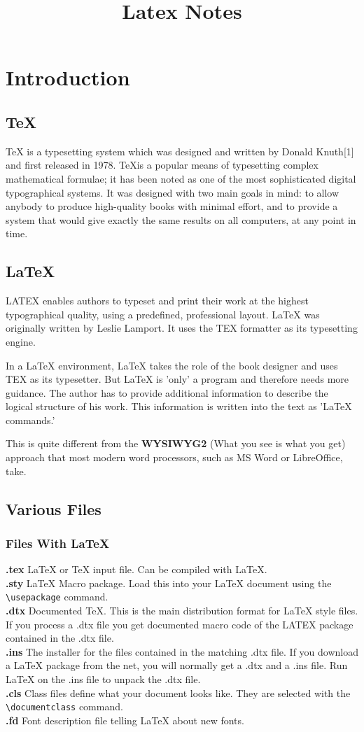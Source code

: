\documentclass[]{article}
\title{Latex Notes}
\begin{document}
\tableofcontents
\section{Introduction}
\subsection{\TeX}
\TeX\; is a typesetting system which was designed and written by Donald Knuth[1] and first released in 1978. \TeX \;is a popular means of typesetting complex mathematical formulae; it has been noted as one of the most sophisticated digital typographical systems. It was designed with two main goals in mind: to allow anybody to produce high-quality books with minimal effort, and to provide a system that would give exactly the same results on all computers, at any point in time.

\subsection{\LaTeX}
LATEX enables authors to typeset and print their work at the highest typographical quality, using a predefined, professional layout. \LaTeX\; was originally written by Leslie Lamport. It uses the TEX formatter as its typesetting engine.

In a \LaTeX\; environment, \LaTeX\; takes the role of the book designer and
uses TEX as its typesetter. But \LaTeX\; is 'only' a program and therefore
needs more guidance. The author has to provide additional information to
describe the logical structure of his work. This information is written into the text as '\LaTeX\; commands.'

This is quite different from the \textbf{WYSIWYG2} (What you see is what you get) approach that most modern word processors, such as MS Word or LibreOffice, take.

\subsection{Various Files}
\subsubsection{Files With \LaTeX}
\textbf{.tex} \LaTeX\; or \TeX\; input file. Can be compiled with \LaTeX\;.
\\ \textbf{.sty} \LaTeX\; Macro package. Load this into your \LaTeX\; document using the
\verb|\usepackage| command.
\\ \textbf{.dtx} Documented \TeX\;. This is the main distribution format for \LaTeX\; style
files. If you process a .dtx file you get documented macro code of the
LATEX package contained in the .dtx file.
\\ \textbf{.ins} The installer for the files contained in the matching .dtx file. If you
download a \LaTeX\; package from the net, you will normally get a .dtx
and a .ins file. Run \LaTeX\; on the .ins file to unpack the .dtx file.
\\ \textbf{.cls} Class files define what your document looks like. They are selected
with the \verb|\documentclass| command.
\\ \textbf{.fd }Font description file telling \LaTeX\; about new fonts.
\end{document}
